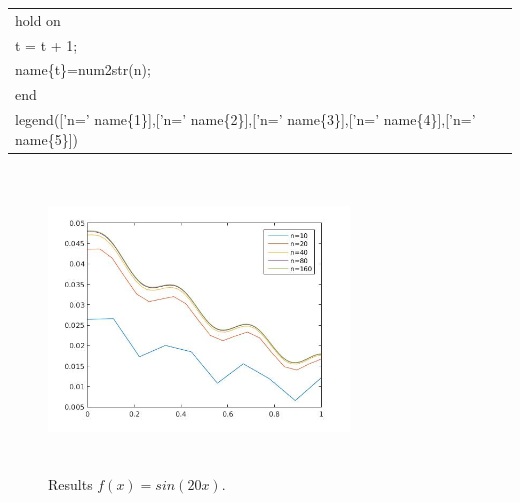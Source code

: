 \documentclass[a4paper,10pt]{report}
\begin{document}
\begin{enumerate}
\begin{table}
\begin{tabular}{ |l| }
\hspace{1cm}hold on\\
\hspace{1cm}t = t + 1;\\
\hspace{1cm}name\{t\}=num2str(n);\\
\hspace{0.5cm}end\\
\hspace{0.5cm}legend(['n=' name\{1\}],['n=' name\{2\}],['n=' name\{3\}],['n=' name\{4\}],['n=' name\{5\}])\\
\hline
\end{tabular}
\end{table}
\begin{figure}
\centering 
\vspace{-10pt}
\includegraphics[width=8cm,height=8cm,keepaspectratio]{result.jpg}
\caption{ Results $f (x) = sin(20x)$.}\label{fig:hep_2}
\vspace{-10pt}
\end{figure} 
\end{enumerate}
\end{document}
